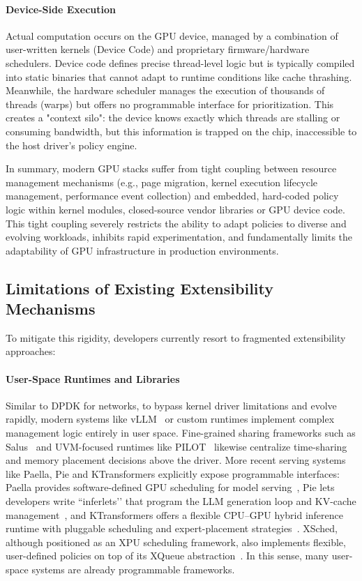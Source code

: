 \paragraph{Device-Side Execution}
Actual computation occurs on the GPU device, managed by a combination of user-written kernels (Device Code) and proprietary firmware/hardware schedulers. Device code defines precise thread-level logic but is typically compiled into static binaries that cannot adapt to runtime conditions like cache thrashing. Meanwhile, the hardware scheduler manages the execution of thousands of threads (warps) but offers no programmable interface for prioritization. This creates a "context silo": the device knows exactly which threads are stalling or consuming bandwidth, but this information is trapped on the chip, inaccessible to the host driver's policy engine.


In summary, modern GPU stacks suffer from tight coupling between resource management mechanisms (e.g.,  page migration, kernel execution lifecycle management, performance event collection) and embedded, hard-coded policy logic within kernel modules, closed-source vendor libraries or GPU device code. This tight coupling severely restricts the ability to adapt policies to diverse and evolving workloads, inhibits rapid experimentation, and fundamentally limits the adaptability of GPU infrastructure in production environments.

\subsection{Limitations of Existing Extensibility Mechanisms}

To mitigate this rigidity, developers currently resort to fragmented extensibility approaches:

\paragraph{User-Space Runtimes and Libraries}
Similar to DPDK for networks, to bypass kernel driver limitations and evolve
rapidly, modern systems like vLLM~\cite{kwon2023efficient} or custom runtimes
implement complex management logic entirely in user space. Fine-grained sharing
frameworks such as Salus~\cite{salus} and UVM-focused runtimes like
PILOT~\cite{pilot} likewise centralize time-sharing and memory placement
decisions above the driver. More recent serving systems like Paella, Pie and
KTransformers explicitly expose programmable interfaces: Paella provides
software-defined GPU scheduling for model serving~\cite{paella}, Pie lets
developers write “inferlets’’ that program the LLM generation loop and KV-cache
management~\cite{pie}, and KTransformers offers a flexible CPU–GPU hybrid
inference runtime with pluggable scheduling and expert-placement
strategies~\cite{ktransformers}. XSched, although positioned as an XPU
scheduling framework, also implements flexible, user-defined policies on top of
its XQueue abstraction~\cite{xsched}. In this sense, many user-space systems
are already programmable frameworks.

